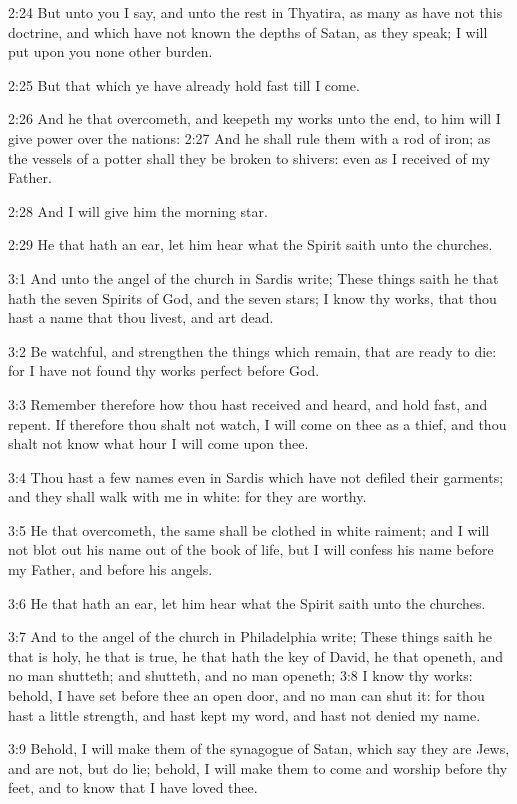2:24 But unto you I say, and unto the rest in Thyatira, as many as have not this doctrine, and which have not known the depths of Satan, as they speak; I will put upon you none other burden.

2:25 But that which ye have already hold fast till I come.

2:26 And he that overcometh, and keepeth my works unto the end, to him will I give power over the nations: 2:27 And he shall rule them with a rod of iron; as the vessels of a potter shall they be broken to shivers: even as I received of my Father.

2:28 And I will give him the morning star.

2:29 He that hath an ear, let him hear what the Spirit saith unto the churches.

3:1 And unto the angel of the church in Sardis write; These things saith he that hath the seven Spirits of God, and the seven stars; I know thy works, that thou hast a name that thou livest, and art dead.

3:2 Be watchful, and strengthen the things which remain, that are ready to die: for I have not found thy works perfect before God.

3:3 Remember therefore how thou hast received and heard, and hold fast, and repent. If therefore thou shalt not watch, I will come on thee as a thief, and thou shalt not know what hour I will come upon thee.

3:4 Thou hast a few names even in Sardis which have not defiled their garments; and they shall walk with me in white: for they are worthy.

3:5 He that overcometh, the same shall be clothed in white raiment; and I will not blot out his name out of the book of life, but I will confess his name before my Father, and before his angels.

3:6 He that hath an ear, let him hear what the Spirit saith unto the churches.

3:7 And to the angel of the church in Philadelphia write; These things saith he that is holy, he that is true, he that hath the key of David, he that openeth, and no man shutteth; and shutteth, and no man openeth; 3:8 I know thy works: behold, I have set before thee an open door, and no man can shut it: for thou hast a little strength, and hast kept my word, and hast not denied my name.

3:9 Behold, I will make them of the synagogue of Satan, which say they are Jews, and are not, but do lie; behold, I will make them to come and worship before thy feet, and to know that I have loved thee.

